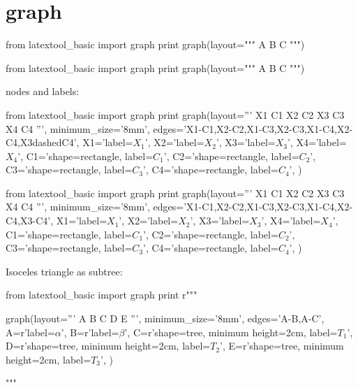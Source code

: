 \section{graph}

\begin{console}
\begin{python}
from latextool_basic import graph
print graph(layout="""
A
B C
""")
\end{python}
\end{console}

\begin{python}
from latextool_basic import graph
print graph(layout="""
A
B C
""")
\end{python}



\newpage
nodes and labels:
\begin{console}
\begin{python}
from latextool_basic import graph
print graph(layout='''
     X1  C1
     X2  C2
     X3  C3
     X4  C4
''',
minimum_size='8mm',
edges='X1-C1,X2-C2,X1-C3,X2-C3,X1-C4,X2-C4,X3dashedC4',
X1='label=$X_1$',
X2='label=$X_2$',
X3='label=$X_3$',
X4='label=$X_4$',
C1='shape=rectangle, label=$C_1$',
C2='shape=rectangle, label=$C_2$',
C3='shape=rectangle, label=$C_3$',
C4='shape=rectangle, label=$C_4$',
)
\end{python}
\end{console}

\begin{python}
from latextool_basic import graph
print graph(layout='''
     X1  C1
     X2  C2
     X3  C3
     X4  C4
''',
minimum_size='8mm',
edges='X1-C1,X2-C2,X1-C3,X2-C3,X1-C4,X2-C4,X3-C4',
X1='label=$X_1$',
X2='label=$X_2$',
X3='label=$X_3$',
X4='label=$X_4$',
C1='shape=rectangle, label=$C_1$',
C2='shape=rectangle, label=$C_2$',
C3='shape=rectangle, label=$C_3$',
C4='shape=rectangle, label=$C_4$',
)
\end{python}



\newpage
Isoceles triangle as subtree:
\begin{python}
from latextool_basic import graph
print r"""
\begin{console}
graph(layout='''
     A
   B   C
  D E
''',
minimum_size='8mm',
edges='A-B,A-C',
A=r'label=$\alpha$',
B=r'label=$\beta$',
C=r'shape=tree, minimum height=2cm, label=$T_1$',
D=r'shape=tree, minimum height=2cm, label=$T_2$',
E=r'shape=tree, minimum height=2cm, label=$T_3$',
)
\end{console}"""
\end{python}

